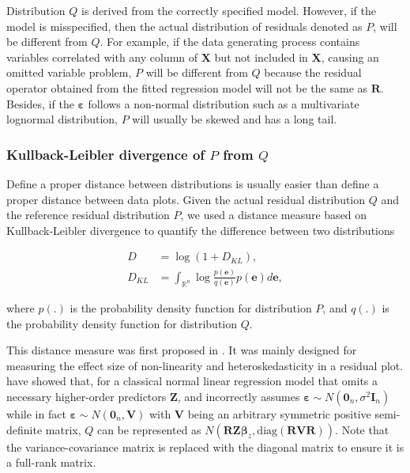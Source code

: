 \documentclass[]{interact}
\theoremstyle{plain}%
\theoremstyle{definition}
\theoremstyle{remark}
\begin{document}
Distribution \(Q\) is derived from the correctly specified model.
However, if the model is misspecified, then the actual distribution of
residuals denoted as \(P\), will be different from \(Q\). For example,
if the data generating process contains variables correlated with any
column of \(\boldsymbol{X}\) but not included in \(\boldsymbol{X}\),
causing an omitted variable problem, \(P\) will be different from \(Q\)
because the residual operator obtained from the fitted regression model
will not be the same as \(\boldsymbol{R}\). Besides, if the
\(\boldsymbol{\varepsilon}\) follows a non-normal distribution such as a
multivariate lognormal distribution, \(P\) will usually be skewed and
has a long tail.

\hypertarget{kullback-leibler-divergence-of-p-from-q}{%
\subsubsection{\texorpdfstring{Kullback-Leibler divergence of \(P\) from
\(Q\)}{Kullback-Leibler divergence of P from Q}}\label{kullback-leibler-divergence-of-p-from-q}}

Define a proper distance between distributions is usually easier than
define a proper distance between data plots. Given the actual residual
distribution \(Q\) and the reference residual distribution \(P\), we
used a distance measure based on Kullback-Leibler divergence
\citep{kullback1951information} to quantify the difference between two
distributions

\begin{align}
\label{eq:kl-0}
D &= \log\left(1 + D_{KL}\right), \\
\label{eq:kl-1}
D_{KL} &= \int_{\mathbb{R}^{n}}\log\frac{p(\boldsymbol{e})}{q(\boldsymbol{e})}p(\boldsymbol{e})d\boldsymbol{e},
\end{align}

\noindent where \(p(.)\) is the probability density function for
distribution \(P\), and \(q(.)\) is the probability density function for
distribution \(Q\).

This distance measure was first proposed in \citet{li2023plot}. It was
mainly designed for measuring the effect size of non-linearity and
heteroskedasticity in a residual plot. \citet{li2023plot} have showed
that, for a classical normal linear regression model that omits a
necessary higher-order predictors \(\boldsymbol{Z}\), and incorrectly
assumes
\(\boldsymbol{\varepsilon} \sim N(\boldsymbol{0}_n,\sigma^2\boldsymbol{I}_n)\)
while in fact
\(\boldsymbol{\varepsilon} \sim N(\boldsymbol{0}_n, \boldsymbol{V})\)
with \(\boldsymbol{V}\) being an arbitrary symmetric positive
semi-definite matrix, \(Q\) can be represented as
\(N(\boldsymbol{R}\boldsymbol{Z}\boldsymbol{\beta}_z, \text{diag}(\boldsymbol{R}\boldsymbol{V}\boldsymbol{R}))\).
Note that the variance-covariance matrix is replaced with the diagonal
matrix to ensure it is a full-rank matrix.
\end{document}
